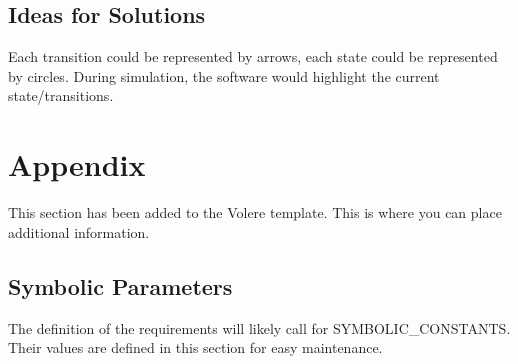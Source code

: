 \documentclass[12pt, titlepage]{article}
\begin{document}
\subsection{Ideas for Solutions}
Each transition could be represented by arrows, each state could be represented
by circles. During simulation, the software would highlight the current
state/transitions.






\newpage

\section{Appendix}

This section has been added to the Volere template. This is where you can place
additional information.

\subsection{Symbolic Parameters}

The definition of the requirements will likely call for SYMBOLIC\_CONSTANTS.
Their values are defined in this section for easy maintenance.
\end{document}

